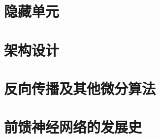 
\section{隐藏单元}
\label{sec:6.3}

\section{架构设计}
\label{sec:6.4}

\section{反向传播及其他微分算法}
\label{sec:6.5}

\section{前馈神经网络的发展史}
\label{sec:6.6}
